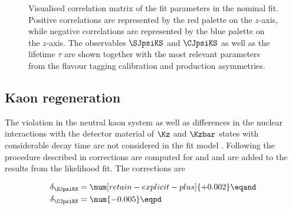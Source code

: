 %
\begin{figure}
\centering
  
  \caption{Visualised correlation matrix of the fit parameters in
    the nominal fit. Positive correlations are represented by the red palette on
    the $z$-axis, while negative correlations are represented by the blue
    palette on the $z$-axis. The \CP observables $\SJpsiKS$ and $\CJpsiKS$ as
    well as the \Bd lifetime $\tau$ are shown together with the most relevant
    parameters from the flavour tagging calibration and production asymmetries.}
  \label{fig:measurement_of_sin2beta:cpv_measurement:results:plots:correlation_matrix}
\end{figure}

\subsection{Kaon regeneration}
\label{sec:measurement_of_sin2beta:cpv_measurement:kaon_regeneration}

The \CP violation in the neutral kaon system as well as differences in the
nuclear interactions with the detector material of $\Kz$ and $\Kzbar$ states
with considerable decay time are not considered in the fit model
\cite{set:kaonregeneration}. Following the procedure described in
\cite{Aaij:2014gsa} corrections are computed for \SJpsiKS and \CJpsiKS and are
added to the results from the likelihood fit. The corrections are

\begin{equation}
  \begin{split}
    \delta_{\SJpsiKS} &= \num[retain-explicit-plus]{+0.002} \eqand\\
    \delta_{\CJpsiKS} &= \num{-0.005} \eqpd
  \end{split}
\end{equation}

